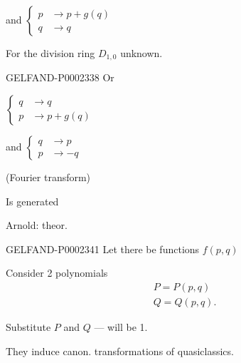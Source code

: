 and
$\left\{\begin{aligned}p&\to p+g (q)\\q&\to q\end{aligned}\right. $



For the division ring $D_{1,0}$ unknown.



\begin{GelfandAdjacentEvidence}{GELFAND-P000233}{8}
Or 
\end{GelfandAdjacentEvidence}


$\left\{\begin{aligned}q&\to q\\p&\to p+g (q)\end{aligned}\right. $



and
$\left\{\begin{aligned}q&\to p\\p&\to -q\end{aligned}\right. $

(Fourier transform)



Is generated





Arnold: theor.



\begin{GelfandAdjacentEvidence}{GELFAND-P000234}{1}
Let there be functions $f (p, q)$



\end{GelfandAdjacentEvidence}

Consider 2 polynomials
\begin{gather*}
 P=P (p, q)\\
 Q=Q (p, q).
\end{gather*}



Substitute $P$ and $Q$ — will be 1.



They induce canon. transformations of quasiclassics.



